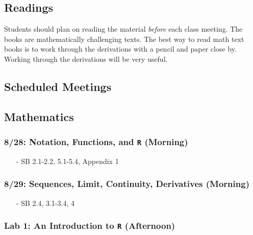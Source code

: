 \documentclass[11pt,letterpaper]{article}
\numberwithin{equation}{section}
\begin{document}
\subsection*{Readings} Students should plan on reading the material \emph{before} each class meeting.  The books are mathematically challenging texts.  The best way to read math text books is to work through the derivations with a pencil and paper close by.  Working through the derivations will be very useful.  %


\newpage


\subsection*{Scheduled Meetings}

\subsection*{Mathematics}


\subsubsection*{8/28: Notation, Functions, and {\tt R} (Morning)}
\begin{itemize}
\item[-] SB 2.1-2.2, 5.1-5.4, Appendix 1
\end{itemize}

\subsubsection*{8/29: Sequences, Limit, Continuity, Derivatives (Morning)}

\begin{itemize}
\item[-] SB 2.4, 3.1-3.4, 4
\end{itemize}


\subsubsection*{Lab 1: An Introduction to {\tt R} (Afternoon)}
\end{document}
